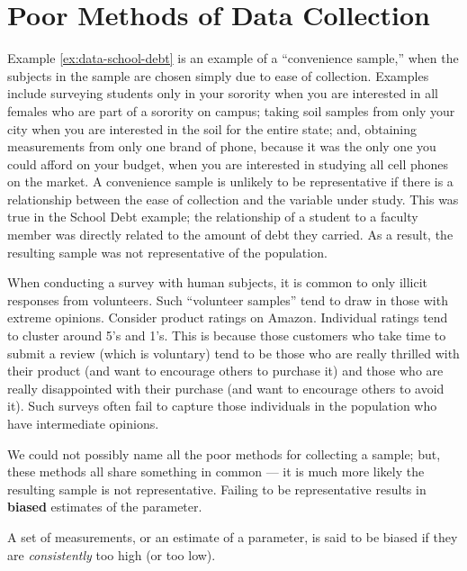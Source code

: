 \documentclass[]{book}
\theoremstyle{definition}
\theoremstyle{definition}
\theoremstyle{definition}
\theoremstyle{remark}
\let\BeginKnitrBlock\begin \let\EndKnitrBlock\end
\begin{document}
\section{Poor Methods of Data
Collection}\label{poor-methods-of-data-collection}

Example \ref{ex:data-school-debt} is an example of a ``convenience
sample,'' when the subjects in the sample are chosen simply due to ease
of collection. Examples include surveying students only in your sorority
when you are interested in all females who are part of a sorority on
campus; taking soil samples from only your city when you are interested
in the soil for the entire state; and, obtaining measurements from only
one brand of phone, because it was the only one you could afford on your
budget, when you are interested in studying all cell phones on the
market. A convenience sample is unlikely to be representative if there
is a relationship between the ease of collection and the variable under
study. This was true in the School Debt example; the relationship of a
student to a faculty member was directly related to the amount of debt
they carried. As a result, the resulting sample was not representative
of the population.

When conducting a survey with human subjects, it is common to only
illicit responses from volunteers. Such ``volunteer samples'' tend to
draw in those with extreme opinions. Consider product ratings on Amazon.
Individual ratings tend to cluster around 5's and 1's. This is because
those customers who take time to submit a review (which is voluntary)
tend to be those who are really thrilled with their product (and want to
encourage others to purchase it) and those who are really disappointed
with their purchase (and want to encourage others to avoid it). Such
surveys often fail to capture those individuals in the population who
have intermediate opinions.

We could not possibly name all the poor methods for collecting a sample;
but, these methods all share something in common --- it is much more
likely the resulting sample is not representative. Failing to be
representative results in \textbf{biased} estimates of the parameter.

\BeginKnitrBlock{definition}[Bias]
\protect\hypertarget{def:defn-bias}{}{\label{def:defn-bias} {} }A set of measurements, or an estimate of a parameter, is said to
be biased if they are \emph{consistently} too high (or too low).
\EndKnitrBlock{definition}
\end{document}
